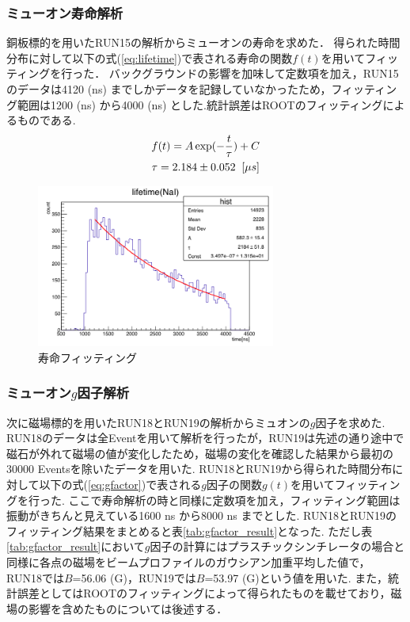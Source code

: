 
\subsubsection{ミューオン寿命解析}

銅板標的を用いたRUN15の解析からミューオンの寿命を求めた．
得られた時間分布に対して以下の式(\ref{eq:lifetime})で表される寿命の関数$f(t)$を用いてフィッティングを行った．
バックグラウンドの影響を加味して定数項を加え，RUN15のデータは4120 (ns) までしかデータを記録していなかったため，フィッティング範囲は1200 (ns) から4000 (ns) とした.統計誤差はROOTのフィッティングによるものである.
\begin{gather}
  f(t) = A\exp(-\frac{t}{\tau})+C \label{eq:lifetime}\\
  \tau = 2.184 \pm 0.052 \;\;[\mu s] \notag
\end{gather}
\begin{figure}[H]
  \centering
    \includegraphics[width  = 0.7\textwidth]{figure/mino/lifetime_NaI_ratio.png}
    \caption{寿命フィッティング}
\end{figure}


\subsubsection{ミューオン$g$因子解析}

次に磁場標的を用いたRUN18とRUN19の解析からミュオンの$g$因子を求めた.
RUN18のデータは全Eventを用いて解析を行ったが，RUN19は先述の通り途中で磁石が外れて磁場の値が変化したため，磁場の変化を確認した結果から最初の30000 Eventsを除いたデータを用いた.
RUN18とRUN19から得られた時間分布に対して以下の式(\ref{eq:gfactor})で表される$g$因子の関数$g(t)$を用いてフィッティングを行った.
ここで寿命解析の時と同様に定数項を加え，フィッティング範囲は振動がきちんと見えている1600 ns から8000 ns までとした.
RUN18とRUN19のフィッティング結果をまとめると表\ref{tab:gfactor_result}となった.
ただし表\ref{tab:gfactor_result}において$g$因子の計算にはプラスチックシンチレータの場合と同様に各点の磁場をビームプロファイルのガウシアン加重平均した値で，RUN18では$B$=56.06 (G)，RUN19では$B$=53.97 (G)という値を用いた.
また，統計誤差としてはROOTのフィッティングによって得られたものを載せており，磁場の影響を含めたものについては後述する．

